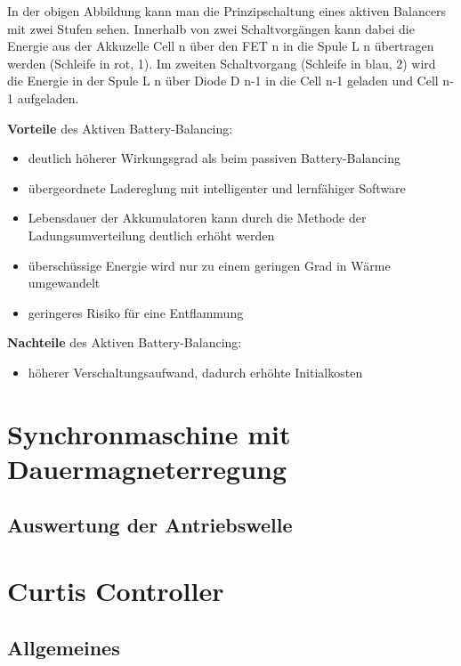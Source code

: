 In der obigen Abbildung kann man die Prinzipschaltung eines aktiven Balancers mit zwei Stufen sehen. Innerhalb von zwei Schaltvorgängen kann dabei die Energie aus der Akkuzelle Cell n über den FET n in die Spule L n übertragen werden (Schleife in rot, 1).
Im zweiten Schaltvorgang (Schleife in blau, 2) wird die Energie in der Spule L n über Diode D n-1 in die Cell n-1 geladen und Cell n-1 aufgeladen.

\textbf{Vorteile} des Aktiven Battery-Balancing:
\begin{itemize}
\item {deutlich höherer Wirkungsgrad als beim passiven Battery-Balancing} \medskip\\
\item {übergeordnete Ladereglung mit intelligenter und lernfähiger Software} \medskip\\
\item {Lebensdauer der Akkumulatoren kann durch die Methode der Ladungsumverteilung deutlich erhöht werden} \medskip\\
\item {überschüssige Energie wird nur zu einem geringen Grad in Wärme umgewandelt} \medskip\\
\item {geringeres Risiko für eine Entflammung} \medskip\\
\end{itemize}

\textbf{Nachteile} des Aktiven Battery-Balancing:
\begin{itemize}
\item {höherer Verschaltungsaufwand, dadurch erhöhte Initialkosten} \medskip\\
\end{itemize}


\section{Synchronmaschine mit Dauermagneterregung}
\subsection{Auswertung der Antriebswelle}

\section{Curtis Controller}
\subsection{Allgemeines}
